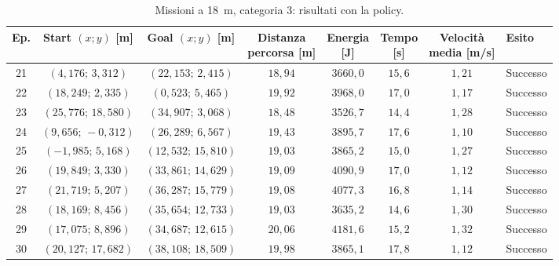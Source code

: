 \begin{table}[H]
\centering
\caption{Missioni a 18~m, categoria 3: risultati con la policy.}
\label{tab:big-map-18m-cat3}
\begingroup
\fontsize{9}{11}\selectfont
\setlength{\tabcolsep}{2.5pt}
\renewcommand{\arraystretch}{1.2}
\begin{tabular}{@{}c cc cccc l@{}}
\toprule
Ep. & \shortstack{Start $(x;y)$\\{}[m]} & \shortstack{Goal $(x;y)$\\{}[m]} & \shortstack{Distanza\\percorsa [m]} & \shortstack{Energia\\{}[J]} & \shortstack{Tempo\\{}[s]} & \shortstack{Velocità\\media [m/s]} & Esito \\
\midrule
21 & $(4{,}176;\,3{,}312)$ & $(22{,}153;\,2{,}415)$ & $18{,}94$ & $3660{,}0$ & $15{,}6$ & $1{,}21$ & Successo \\
22 & $(18{,}249;\,2{,}335)$ & $(0{,}523;\,5{,}465)$ & $19{,}92$ & $3968{,}0$ & $17{,}0$ & $1{,}17$ & Successo \\
23 & $(25{,}776;\,18{,}580)$ & $(34{,}907;\,3{,}068)$ & $18{,}48$ & $3526{,}7$ & $14{,}4$ & $1{,}28$ & Successo \\
24 & $(9{,}656;\,-0{,}312)$ & $(26{,}289;\,6{,}567)$ & $19{,}43$ & $3895{,}7$ & $17{,}6$ & $1{,}10$ & Successo \\
25 & $(-1{,}985;\,5{,}168)$ & $(12{,}532;\,15{,}810)$ & $19{,}03$ & $3865{,}2$ & $15{,}0$ & $1{,}27$ & Successo \\
26 & $(19{,}849;\,3{,}330)$ & $(33{,}861;\,14{,}629)$ & $19{,}09$ & $4090{,}9$ & $17{,}0$ & $1{,}12$ & Successo \\
27 & $(21{,}719;\,5{,}207)$ & $(36{,}287;\,15{,}779)$ & $19{,}08$ & $4077{,}3$ & $16{,}8$ & $1{,}14$ & Successo \\
28 & $(18{,}169;\,8{,}456)$ & $(35{,}654;\,12{,}733)$ & $19{,}03$ & $3635{,}2$ & $14{,}6$ & $1{,}30$ & Successo \\
29 & $(17{,}075;\,8{,}896)$ & $(34{,}687;\,12{,}615)$ & $20{,}06$ & $4181{,}6$ & $15{,}2$ & $1{,}32$ & Successo \\
30 & $(20{,}127;\,17{,}682)$ & $(38{,}108;\,18{,}509)$ & $19{,}98$ & $3865{,}1$ & $17{,}8$ & $1{,}12$ & Successo \\
\bottomrule
\end{tabular}
\endgroup
\end{table}

